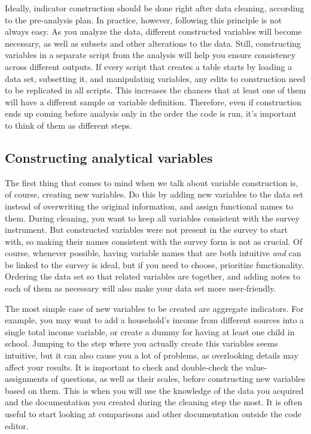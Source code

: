 Ideally, indicator construction should be done right after data cleaning,
according to the pre-analysis plan.
In practice, however, following this principle is not always easy.
As you analyze the data, different constructed variables will become necessary,
as well as subsets and other alterations to the data.
Still, constructing variables in a separate script from the analysis
will help you ensure consistency across different outputs.
If every script that creates a table starts by loading a data set,
subsetting it, and manipulating variables,
any edits to construction need to be replicated in all scripts.
This increases the chances that at least one of them will have a different sample or variable definition.
Therefore, even if construction ends up coming before analysis only in the order the code is run,
it's important to think of them as different steps.

\subsection{Constructing analytical variables}

The first thing that comes to mind when we talk about variable construction is, of course, creating new variables.
Do this by adding new variables to the data set instead of overwriting the original information,
and assign functional names to them.
During cleaning, you want to keep all variables consistent with the survey instrument.
But constructed variables were not present in the survey to start with,
so making their names consistent with the survey form is not as crucial.
Of course, whenever possible, having variable names that are both intuitive
\textit{and} can be linked to the survey is ideal,
but if you need to choose, prioritize functionality.
Ordering the data set so that related variables are together,
and adding notes to each of them as necessary will also make your data set more user-friendly.

The most simple case of new variables to be created are aggregate indicators.
For example, you may want to add a household's income from different sources into a single total income variable,
or create a dummy for having at least one child in school.
Jumping to the step where you actually create this variables seems intuitive,
but it can also cause you a lot of problems,
as overlooking details may affect your results.
It is important to check and double-check the value-assignments of questions,
as well as their scales, before constructing new variables based on them.
This is when you will use the knowledge of the data you acquired and the documentation you created during the cleaning step the most.
It is often useful to start looking at comparisons and other documentation outside the code editor.

